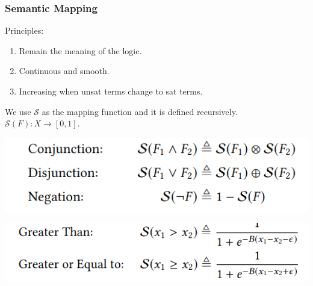 \documentclass[11pt]{beamer}
\begin{document}
\begin{frame}\frametitle{Semantic Mapping}
Principles:
\begin{enumerate}
\item Remain the meaning of the logic.
\item Continuous and smooth.
\item Increasing when unsat terms change to sat terms.
\end{enumerate}
We use $\mathcal{S}$ as the mapping function and it is defined recursively. $\mathcal{S}(F) : X \rightarrow [0,1]$.
\begin{center}
\includegraphics[scale=0.4]{2.png}

\includegraphics[scale=0.4]{3.png}
\end{center}
\end{frame}
\end{document}
